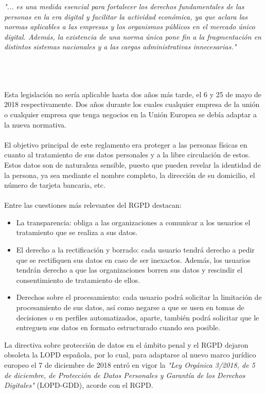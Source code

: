 \begin{refsection}
\begin{minipage}[t]{0.2\linewidth}
\end{minipage}
\hfill
\begin{minipage}[t]{0.9\linewidth}
  \textit{"... es una medida esencial para fortalecer los derechos fundamentales de las personas en la era digital y facilitar la actividad económica, ya que aclara las normas aplicables a las empresas y los organismos públicos en el mercado único digital. Además, la existencia de una norma única pone fin a la fragmentación en distintos sistemas nacionales y a las cargas administrativas innecesarias."}
\end{minipage}
\\ \\ \\
Esta legislación no sería aplicable hasta dos años más tarde, el 6 y 25 de mayo de 2018 respectivamente. Dos años durante los cuales cualquier empresa de la unión o cualquier empresa que tenga negocios en la Unión Europea se debía adaptar a la nueva normativa.
\\ \\
El objetivo principal de este reglamento era proteger a las personas físicas en cuanto al tratamiento de sus datos personales y a la libre circulación de estos. Estos datos son de naturaleza sensible, puesto que pueden revelar la identidad de la persona, ya sea mediante el nombre completo, la dirección de su domicilio, el número de tarjeta bancaria, etc.
\\ \\
Entre las cuestiones más relevantes del RGPD destacan: 
\begin{itemize}
  \item La transparencia: obliga a las organizaciones a comunicar a los usuarios el tratamiento que se realiza a sus datos.
  \item El derecho a la rectificación y borrado: cada usuario tendrá derecho a pedir que se rectifiquen sus datos en caso de ser inexactos. Además, los usuarios tendrán derecho a que las organizaciones borren sus datos y rescindir el consentimiento de tratamiento de ellos.
  \item Derechos sobre el procesamiento: cada usuario podrá solicitar la limitación de procesamiento de sus datos, así como negarse a que se usen en tomas de decisiones o en perfiles automatizados, aparte, también podrá solicitar que le entreguen sus datos en formato estructurado cuando sea posible.
\end{itemize}
La directiva sobre protección de datos en el ámbito penal y el RGPD dejaron obsoleta la LOPD española, por lo cual, para adaptarse al nuevo marco jurídico europeo el 7 de diciembre de 2018 entró en vigor la \textit{"Ley Orgánica 3/2018, de 5 de diciembre, de Protección de Datos Personales y Garantía de los Derechos Digitales"} \cite{samperLeyOrganica20182020} (LOPD-GDD), acorde con el RGPD.

\end{refsection}
